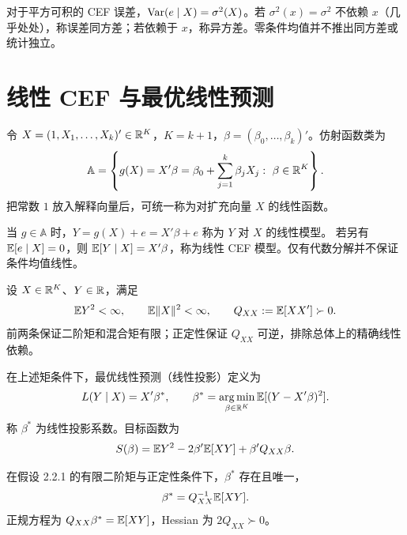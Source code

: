 \begin{definition}[同方差与异方差]\label{reg:entry:22}
对于平方可积的 CEF 误差，$\operatorname{Var}(e\mid X)=\sigma^2(X)$。若 $\sigma^2(x)=\sigma^2$ 不依赖 $x$（几乎处处），称误差同方差；若依赖于 $x$，称异方差。零条件均值并不推出同方差或统计独立。
\end{definition}

\section{线性 CEF 与最优线性预测}

\begin{definition}[仿射函数]\label{reg:entry:23}
令 $X=(1,X_1,\ldots,X_k)'\in\mathbb{R}^K$，$K=k+1$，$\beta=(\beta_0,\ldots,\beta_k)'$。仿射函数类为
\[\mathbb A=\left\{g(X)=X'\beta=\beta_0+\sum_{j=1}^k\beta_jX_j:\ \beta\in\R^K\right\}.\]
把常数 $1$ 放入解释向量后，可统一称为对扩充向量 $X$ 的线性函数。
\end{definition}

\begin{definition}\label{reg:entry:24}
当 $g\in\mathbb A$ 时，$Y=g(X)+e=X'\beta+e$ 称为 $Y$ 对 $X$ 的线性模型。
若另有 $\mathbb{E}[e\mid X]=0$，则 $\mathbb{E}[Y\mid X]=X'\beta$，称为线性 CEF 模型。仅有代数分解并不保证条件均值线性。
\end{definition}

\begin{proposition}[线性预测的矩与识别条件（假设 2.2.1）]\label{reg:entry:25}
设 $X\in\mathbb{R}^K$、$Y\in\mathbb{R}$，满足
\[\mathbb{E} Y^2<\infty,\qquad \mathbb{E}\|X\|^2<\infty,\qquad Q_{XX}:=\mathbb{E}[XX']\succ0.\]
前两条保证二阶矩和混合矩有限；正定性保证 $Q_{XX}$ 可逆，排除总体上的精确线性依赖。
\end{proposition}

\begin{definition}[最优线性预测与投影系数]\label{reg:entry:26}
在上述矩条件下，最优线性预测（线性投影）定义为
\[L(Y\mid X)=X'\beta^*,\qquad \beta^*=\operatorname*{arg\,min}_{\beta\in\mathbb{R}^K}\mathbb{E}[(Y-X'\beta)^2].\]
称 $\beta^*$ 为线性投影系数。目标函数为
\[S(\beta)=\mathbb{E} Y^2-2\beta'\mathbb{E}[XY]+\beta'Q_{XX}\beta.\]
\end{definition}

\begin{theorem}[投影系数的存在唯一性]\label{reg:entry:27}
在假设 2.2.1 的有限二阶矩与正定性条件下，$\beta^*$ 存在且唯一，
\[\beta^*=Q_{XX}^{-1}\mathbb{E}[XY].\]
正规方程为 $Q_{XX}\beta^*=\mathbb{E}[XY]$，Hessian 为 $2Q_{XX}\succ0$。
\end{theorem}


